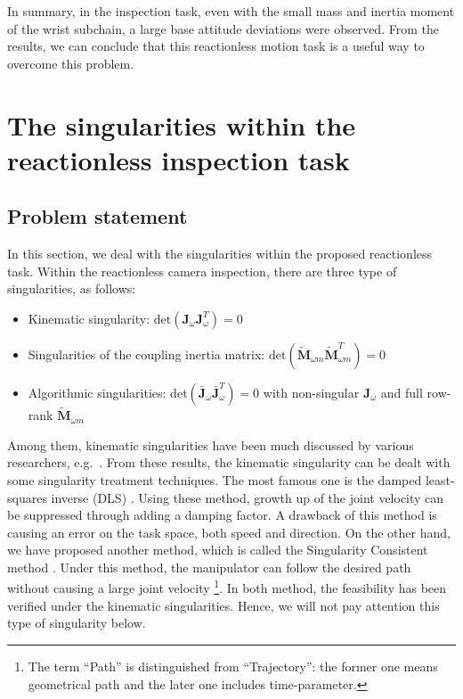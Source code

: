 \documentclass[preprint,12pt]{elsarticle}
\def\tbm#1{{\tilde{\bbm{#1}}}}
\def\bbm#1{\bm{#1}}
\begin{document}
In summary,
in the inspection task,
even with the small mass and inertia moment of the wrist subchain,
a large base attitude deviations were observed.
From the results,
we can conclude that this reactionless motion task is a useful way to overcome this problem.


\section{The singularities within the reactionless inspection task}
\label{sec:SINGULAR}
\subsection{Problem statement}
\label{sec:PROBLEM}

In this section, we deal with the singularities within the proposed reactionless task.
Within the reactionless camera inspection,
there are three type of singularities, as follows:
\begin{itemize}
\item Kinematic singularity: $\mathrm{det}(\bm{J}_{\omega}\bm{J}_{\omega}^{T}) = 0$
\item Singularities of the coupling inertia matrix: $\mathrm{det}(\tbm{M}_{\omega m}\tbm{M}_{\omega m}^{T}) = 0$
\item Algorithmic singularities: $\mathrm{det}(\bar{\bm{J}}_{\omega}\bar{\bm{J}}_{\omega}^{T}) = 0$
with non-singular $\bm{J}_{\omega}$ and full row-rank $\tbm{M}_{\omega m}$
\end{itemize}

Among them, kinematic singularities have been much discussed by various researchers, e.g.\ \cite{Kreutz-Delgado1992,Boudreau2010}.
From these results,
the kinematic singularity can be dealt with some singularity treatment techniques.
The most famous one is the damped least-squares inverse (DLS) \cite{Chiaverini1994}.
Using these method, growth up of the joint velocity can be suppressed through adding a damping factor.
A drawback of this method is causing an error on the task space, both speed and direction.
On the other hand, we have proposed another method, which is called the Singularity Consistent method \cite{Nenchev2000}.
Under this method, the manipulator can follow the desired path without causing a large joint velocity
\footnote{The term ``Path'' is distinguished from ``Trajectory'':
the former one means geometrical path and the later one includes time-parameter.}.
In both method,
the feasibility has been verified under the kinematic singularities.
Hence, we will not pay attention this type of singularity below.
\end{document}
